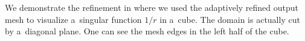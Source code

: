 We demonstrate the refinement in  where we used the adaptively refined output mesh to
visualize a~singular function $1/r$ in a~cube. The domain is actually cut by a~diagonal plane. One can see the mesh edges in
the left half of the cube.

\pagebreak






% 
%   
%   
%   
%   
%   

